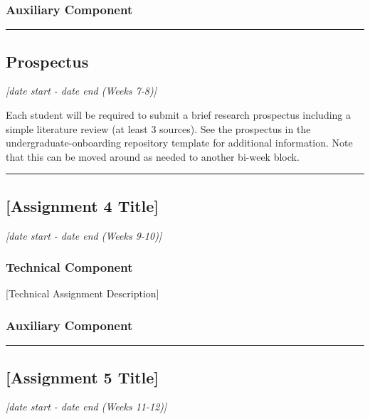 \documentclass[12pt]{article}
\begin{document}
\subsubsection{Auxiliary Component}
\label{sssec:a3a}



\vspace{1em}\hrule\vspace{1em}
\subsection{Prospectus}
\label{ssec:prospectus}
\textit{[date start - date end (Weeks 7-8)]}

Each student will be required to submit a brief research prospectus including a simple literature review (at least 3 sources).  See the prospectus in the undergraduate-onboarding repository template for additional information.  Note that this can be moved around as needed to another bi-week block.



\vspace{1em}\hrule\vspace{1em}
\subsection{[Assignment 4 Title]}
\label{ssec:a4}

\textit{[date start - date end (Weeks 9-10)]}


\subsubsection{Technical Component}
\label{sssec:a4t}

[Technical Assignment Description]


\subsubsection{Auxiliary Component}
\label{sssec:a4a}



\vspace{1em}\hrule\vspace{1em}
\subsection{[Assignment 5 Title]}
\label{ssec:a5}

\textit{[date start - date end (Weeks 11-12)]}
\end{document}
